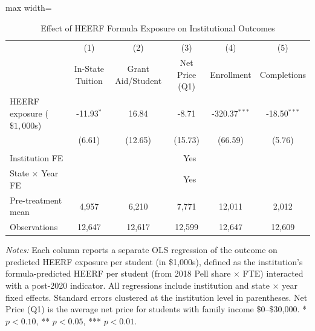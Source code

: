 \begin{table}[H]
\centering
\caption{Effect of HEERF Formula Exposure on Institutional Outcomes}
\begin{threeparttable}
\begin{adjustbox}{max width=\textwidth}
\begin{tabular}{lccccc}
\toprule
& (1) & (2) & (3) & (4) & (5) \\
& In-State Tuition & Grant Aid/Student & Net Price (Q1) & Enrollment & Completions \\
\midrule
HEERF exposure ($\$1{,}000$s) & -11.93$^{*}$ & 16.84 & -8.71 & -320.37$^{***}$ & -18.50$^{***}$ \\
 & (6.61) & (12.65) & (15.73) & (66.59) & (5.76) \\
\\
Institution FE & \multicolumn{5}{c}{Yes} \\
State $\times$ Year FE & \multicolumn{5}{c}{Yes} \\
Pre-treatment mean & 4,957 & 6,210 & 7,771 & 12,011 & 2,012 \\
Observations & 12,647 & 12,617 & 12,599 & 12,647 & 12,609 \\
\bottomrule
\end{tabular}
\end{adjustbox}
\end{threeparttable}
\par\vspace{0.3em}
\begin{minipage}{\textwidth}
{\footnotesize \textit{Notes:} Each column reports a separate OLS regression of the outcome on predicted HEERF exposure per student (in \$1,000s), defined as the institution's formula-predicted HEERF per student (from 2018 Pell share $\times$ FTE) interacted with a post-2020 indicator. All regressions include institution and state $\times$ year fixed effects. Standard errors clustered at the institution level in parentheses. Net Price (Q1) is the average net price for students with family income \$0--\$30,000. * $p<0.10$, ** $p<0.05$, *** $p<0.01$.}
\end{minipage}
\label{tab:main}
\end{table}

